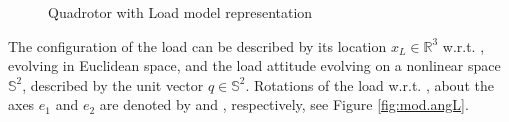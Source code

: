 \begin{figure}[h!]
	\centering
	\caption{Quadrotor with Load model representation\label{fig:mod.modelQRL}}
\end{figure}		

The configuration of the load can be described by its location $x_L\in \mathbb{R}^3 $ w.r.t. \IF, evolving in Euclidean space, and the load attitude evolving on a nonlinear space $ \mathbb{S}^2 $, described by the unit vector $ q\in \mathbb{S}^2 $. 
Rotations of the load w.r.t. \IF, about the axes $ e_1$ and $ e_2 $ are denoted by 
 and 
, respectively, see Figure \ref{fig:mod.angL}.\\

